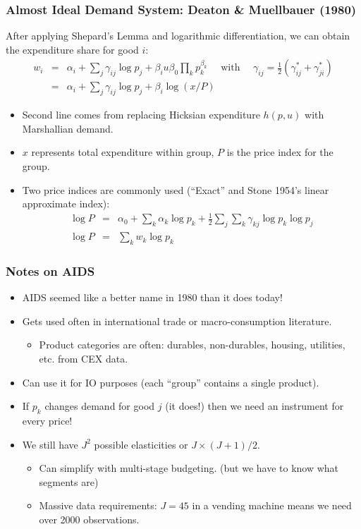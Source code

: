 \documentclass[xcolor=pdftex,dvipsnames,table,mathserif,aspectratio=169]{beamer}
\begin{document}
\begin{frame}
\frametitle{Almost Ideal Demand System: Deaton \& Muellbauer (1980)}
\small
After applying Shepard's Lemma and logarithmic differentiation, we can obtain the expenditure share for good $i$:
\begin{eqnarray*}
w_i &=&\alpha_i + \sum_j \gamma_{ij} \log p_j + \beta_i u \beta_0 \prod_k p_k^{\beta_k} \quad \mbox{ with } \quad \gamma_{ij}= \frac{1}{2} (\gamma_{ij}^* + \gamma_{ji}^*) \\
      &=& \alpha_i + \sum_j \gamma_{ij} \log p_j + \beta_i \log (x / P)
\end{eqnarray*}
\vspace{-0.5cm}
\begin{itemize}
\item Second line comes from replacing Hicksian expenditure $h(p,u)$ with Marshallian demand.
\item $x$ represents total expenditure within group, $P$ is the price index for the group.
\item Two price indices are commonly used (``Exact'' and Stone 1954's linear approximate index):
\begin{eqnarray*}
\log P &=&\alpha_0 + \sum_k \alpha_k \log p_k + \frac{1}{2} \sum_j \sum_k \gamma_{kj} \log p_k \log p_j\\
\log P &=& \sum_k w_k \log p_k
\end{eqnarray*}
\end{itemize}
\end{frame} 

\begin{frame}
\frametitle{Notes on AIDS}
\begin{itemize}
\item AIDS seemed like a better name in 1980 than it does today!
\item Gets used often in international trade or macro-consumption literature.
\begin{itemize}
\item Product categories are often: durables, non-durables, housing, utilities, etc. from CEX data.
\end{itemize}
\item Can use it for IO purposes (each ``group'' contains a single product).
\item If $p_k$ changes demand for good $j$ (it does!) then we need an instrument for every price!
\item We still have $J^2$ possible elasticities or $J \times (J+1)/2$.
\begin{itemize}
\item Can simplify with multi-stage budgeting. (but we have to know what segments are)
\item Massive data requirements: $J=45$ in a vending machine means we need over 2000 observations.
\end{itemize}
\end{itemize}
\end{frame} 
\end{document}
